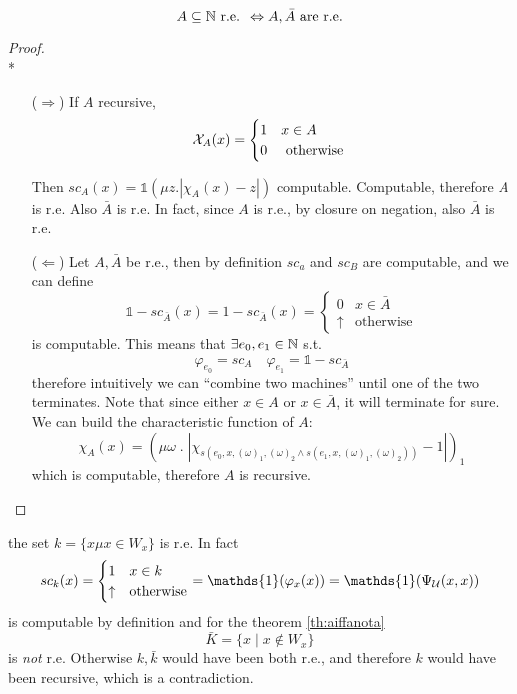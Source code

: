 \begin{theorem}\label{th:aiffanota}
  \[A \subseteq \mathbb{N} \mbox{ r.e. } \Leftrightarrow A, \bar{A} \mbox{
      are r.e.} \]
  \begin{proof}\mbox{}\\*
    \begin{itemize}
    \item[($\Rightarrow$)]
      If $A$ recursive,
      \begin{equation*}
        \mathcal{X}_A(x)= \begin{cases}
          1 & x\in A \\
          0 & $ otherwise $
        \end{cases}
      \end{equation*}

      Then $ sc_A(x) = \mathds{1}(\mu z. | \chi_A(x)- z | )$
      computable. Computable, therefore \textit{A} is r.e. Also
      $\bar{A}$ is r.e. In fact, since $A$ is r.e., by closure on
      negation, also $\bar{A}$ is r.e.

    \item[($\Leftarrow$)] Let $A, \bar{A}$ be r.e., then by definition
      $sc_a$ and $sc_B$ are computable, and we can define
      \[
        \mathds{1} - sc_{\bar{A}}(x) = 1 - sc_{\bar{A}}(x) = \begin{cases}
          0 & x \in \bar{A} \\
          \uparrow & \mbox{otherwise}
        \end{cases}
      \]
      is computable. This means that $\exists e_0, e_1 \in \mathbb{N}$ s.t.
      \[
        \varphi_{e_0} = sc_A \quad \varphi_{e_1} = \mathds{1} -
        sc_{\bar{A}}
      \]
      therefore intuitively we can ``combine two machines'' until one
      of the two terminates. Note that since either $x \in A$ or $x \in \bar{A}$,
      it will terminate for sure. We can build the characteristic function of $A$:
      \[
          \chi_A(x) = (\mu \omega \; . \; |\chi_{s(e_0, x,
            (\omega)_1, (\omega)_2 \wedge s(e_1, x, (\omega)_1,
            (\omega)_2))}-1|)_1
        \]
        which is computable, therefore $A$ is recursive.
    \end{itemize}
  \end{proof}
\end{theorem}

\begin{observation}
  the set $k = \{x \mu x \in W_x\}$ is r.e. In fact
  \[
    sc_k(x) = \begin{cases}
      1 & x \in k \\
      \uparrow & \mbox{otherwise}
    \end{cases}
    = \mathds{1}(\varphi_x(x)) = \mathds{1}(\univ(x,x))
  \]
  is computable by definition and for the theorem \ref{th:aiffanota}
  \[
    \bar{K} = \{x \mid x \notin W_x\}
  \]
  is \emph{not} r.e. Otherwise $k,\bar{k}$ would have been both r.e.,
  and therefore $k$ would have been recursive, which is a
  contradiction.
\end{observation}

